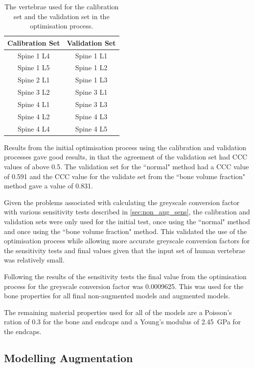 \begin{table}[ht!]
	\caption{The vertebrae used for the calibration set and the validation set in the optimisation process.}
	\label{tab:calib_valid}
	\centering
	\begin{tabular}{c|c}
    Calibration Set   & Validation Set  \\ \hline \hline
    Spine 1 L4 & Spine 1 L1  \\
    Spine 1 L5 & Spine 1 L2\\
    Spine 2 L1 & Spine 1 L3 \\
    Spine 3 L2 & Spine 3 L1\\
    Spine 4 L1 & Spine 3 L3\\
    Spine 4 L2 & Spine 4 L3\\
    Spine 4 L4 & Spine 4 L5 \\
    \hline
	\end{tabular}
\end{table}


Results from the initial optimisation process using the calibration and validation processes gave good results, in that the agreement of the validation set had CCC values of above 0.5.
The validation set for the ``normal" method had a CCC value of 0.591 and the CCC value for the validate set from the ``bone volume fraction" method gave a value of 0.831.

Given the problems associated with calculating the greyscale conversion factor with various sensitivity tests described in \cref{sec:non_aug_sens}, the calibration and validation sets were only used for the initial test, once using the ``normal" method and once using the ``bone volume fraction" method.
This validated the use of the optimisation process while allowing more accurate greyscale conversion factors for the sensitivity tests and final values given that the input set of human vertebrae was relatively small.

Following the results of the sensitivity tests the final value from the optimisation process for the greyscale conversion factor was 0.0009625.
This was used for the bone properties for all final non-augmented models and augmented models.

The remaining material properties used for all of the models are a Poisson's ration of 0.3 for the bone and endcaps and a Young's modulus of 2.45~GPa for the endcaps. 

\subsection{Modelling Augmentation}


